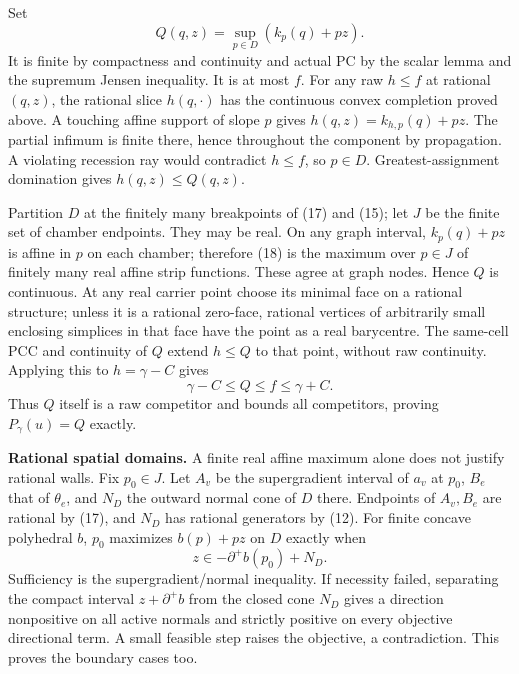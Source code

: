 \documentclass[
  11pt,
]{article}
\begin{document}
Set \[
                            Q(q,z)=\sup_{p\in D}(k_p(q)+pz).             \tag{18}
\] It is finite by compactness and continuity and actual PC by the
scalar lemma and the supremum Jensen inequality. It is at most \(f\).
For any raw \(h\leq f\) at rational \((q,z)\), the rational slice
\(h(q,\cdot)\) has the continuous convex completion proved above. A
touching affine support of slope \(p\) gives \(h(q,z)=k_{h,p}(q)+pz\).
The partial infimum is finite there, hence throughout the component by
propagation. A violating recession ray would contradict \(h\leq f\), so
\(p\in D\). Greatest-assignment domination gives \(h(q,z)\leq Q(q,z)\).

Partition \(D\) at the finitely many breakpoints of (17) and (15); let
\(J\) be the finite set of chamber endpoints. They may be real. On any
graph interval, \(k_p(q)+pz\) is affine in \(p\) on each chamber;
therefore (18) is the maximum over \(p\in J\) of finitely many real
affine strip functions. These agree at graph nodes. Hence \(Q\) is
continuous. At any real carrier point choose its minimal face on a
rational structure; unless it is a rational zero-face, rational vertices
of arbitrarily small enclosing simplices in that face have the point as
a real barycentre. The same-cell PCC and continuity of \(Q\) extend
\(h\leq Q\) to that point, without raw continuity. Applying this to
\(h=\gamma-C\) gives \[
                         \gamma-C\leq Q\leq f\leq\gamma+C.              \tag{19}
\] Thus \(Q\) itself is a raw competitor and bounds all competitors,
proving \(P_\gamma(u)=Q\) exactly.

\textbf{Rational spatial domains.} A finite real affine maximum alone
does not justify rational walls. Fix \(p_0\in J\). Let \(A_v\) be the
supergradient interval of \(a_v\) at \(p_0\), \(B_e\) that of
\(\theta_e\), and \(N_D\) the outward normal cone of \(D\) there.
Endpoints of \(A_v,B_e\) are rational by (17), and \(N_D\) has rational
generators by (12). For finite concave polyhedral \(b\), \(p_0\)
maximizes \(b(p)+pz\) on \(D\) exactly when \[
                                z\in-\partial^+b(p_0)+N_D.             \tag{20}
\] Sufficiency is the supergradient/normal inequality. If necessity
failed, separating the compact interval \(z+\partial^+b\) from the
closed cone \(N_D\) gives a direction nonpositive on all active normals
and strictly positive on every objective directional term. A small
feasible step raises the objective, a contradiction. This proves the
boundary cases too.
\end{document}

